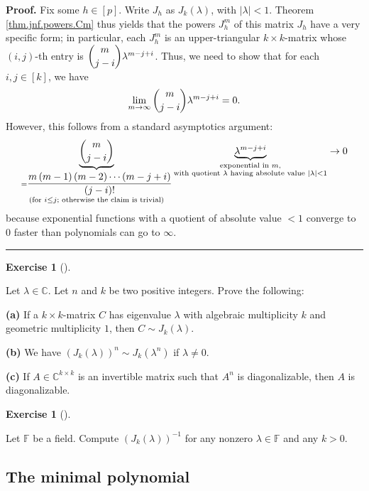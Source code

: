 \documentclass[numbers=enddot,12pt,final,onecolumn,notitlepage]{scrartcl}%
\newcounter{exer}
\numberwithin{exer}{subsection}
\theoremstyle{definition}
\newtheorem{exmp}[exer]{Exercise}
\newenvironment{exercise}[1][]
{\begin{exmp}[#1]\begin{leftbar}}
{\end{leftbar}\end{exmp}}
\newenvironment{proof}[1][Proof]{\noindent\textbf{#1.} }{\ \rule{0.5em}{0.5em}}
\begin{document}
\begin{proof}
Fix some $h\in\left[  p\right]  $. Write $J_{h}$ as $J_{k}\left(
\lambda\right)  $, with $\left\vert \lambda\right\vert <1$. Theorem
\ref{thm.jnf.powers.Cm} thus yields that the powers $J_{h}^{m}$ of this matrix
$J_{h}$ have a very specific form; in particular, each $J_{h}^{m}$ is an
upper-triangular $k\times k$-matrix whose $\left(  i,j\right)  $-th entry is
$\dbinom{m}{j-i}\lambda^{m-j+i}$. Thus, we need to show that for each
$i,j\in\left[  k\right]  $, we have%
\[
\lim\limits_{m\rightarrow\infty}\dbinom{m}{j-i}\lambda^{m-j+i}=0.
\]
However, this follows from a standard asymptotics argument:%
\[
\underbrace{\dbinom{m}{j-i}}_{\substack{=\dfrac{m\left(  m-1\right)  \left(
m-2\right)  \cdots\left(  m-j+i\right)  }{\left(  j-i\right)  !}\\\text{(for
}i\leq j\text{; otherwise the claim is trivial)}}}\underbrace{\lambda^{m-j+i}%
}_{\substack{\text{exponential in }m\text{,}\\\text{with quotient }%
\lambda\text{ having absolute value }\left\vert \lambda\right\vert
<1}}\rightarrow0
\]
because exponential functions with a quotient of absolute value $<1$ converge
to $0$ faster than polynomials can go to $\infty$.
\end{proof}

\begin{exercise}
 Let $\lambda\in\mathbb{C}$. Let $n$ and $k$ be two positive integers.
Prove the following: \medskip

\textbf{(a)} If a $k\times k$-matrix $C$ has eigenvalue $\lambda$ with
algebraic multiplicity $k$ and geometric multiplicity $1$, then $C\sim
J_{k}\left(  \lambda\right)  $. \medskip

\textbf{(b)} We have $\left(  J_{k}\left(  \lambda\right)  \right)  ^{n}\sim
J_{k}\left(  \lambda^{n}\right)  $ if $\lambda\neq0$. \medskip

\textbf{(c)} If $A\in\mathbb{C}^{k\times k}$ is an invertible matrix such that
$A^{n}$ is diagonalizable, then $A$ is diagonalizable.
\end{exercise}

\begin{exercise}
 Let $\mathbb{F}$ be a field. Compute $\left(  J_{k}\left(
\lambda\right)  \right)  ^{-1}$ for any nonzero $\lambda\in\mathbb{F}$ and any
$k>0$.
\end{exercise}

\subsection{The minimal polynomial}
\end{document}
